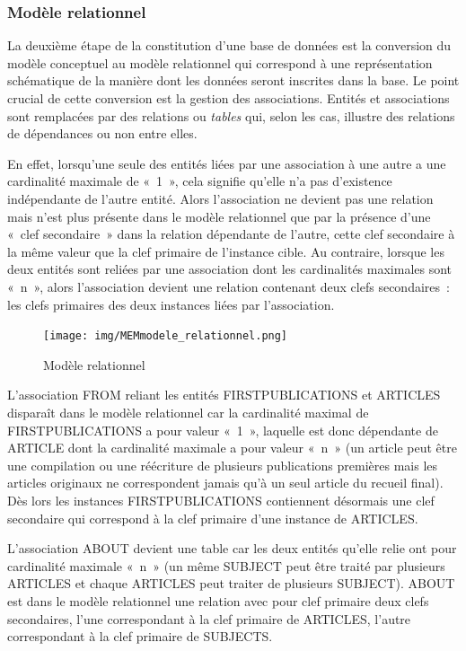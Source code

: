 \documentclass[12pt, a4paper]{article}
\begin{document}
\subsubsection{Modèle relationnel}
\label{ref:db_modele_relationnel}
La deuxième étape de la constitution d'une base de données est la conversion du modèle conceptuel au modèle relationnel qui correspond à une représentation schématique de la manière dont les données seront inscrites dans la base. Le point crucial de cette conversion est la gestion des associations. Entités et associations sont remplacées par des relations ou \textit{tables} qui, selon les cas, illustre des relations de dépendances ou non entre elles.

En effet, lorsqu'une seule des entités liées par une association à une autre a une cardinalité maximale de «~1~», cela signifie qu'elle n'a pas d'existence indépendante de l'autre entité. Alors l'association ne devient pas une relation mais n'est plus présente dans le modèle relationnel que par la présence d'une «~clef secondaire~» dans la relation dépendante de l'autre, cette clef secondaire à la même valeur que la clef primaire de l'instance cible.
Au contraire, lorsque les deux entités sont reliées par une association dont les cardinalités maximales sont «~n~», alors l'association devient une relation contenant deux clefs secondaires~: les clefs primaires des deux instances liées par l'association.

\begin{figure}[H]
    \centering
    \texttt{[image: img/MEMmodele\_relationnel.png]}
    \caption{Modèle relationnel}
    \label{relationnel}
\end{figure}

L'association FROM reliant les entités FIRSTPUBLICATIONS et ARTICLES disparaît dans le modèle relationnel car la cardinalité maximal de FIRSTPUBLICATIONS a pour valeur «~1~», laquelle est donc dépendante de ARTICLE dont la cardinalité maximale a pour valeur «~n~» (un article peut être une compilation ou une réécriture de plusieurs publications premières mais les articles originaux ne correspondent jamais qu'à un seul article du recueil final). Dès lors les instances FIRSTPUBLICATIONS contiennent désormais une clef secondaire qui correspond à la clef primaire d'une instance de ARTICLES.

L'association ABOUT devient une table car les deux entités qu'elle relie ont pour cardinalité maximale «~n~» (un même SUBJECT peut être traité par plusieurs ARTICLES et chaque ARTICLES peut traiter de plusieurs SUBJECT). ABOUT est dans le modèle relationnel une relation avec pour clef primaire deux clefs secondaires, l'une correspondant à la clef primaire de ARTICLES, l'autre correspondant à la clef primaire de SUBJECTS.
\end{document}
